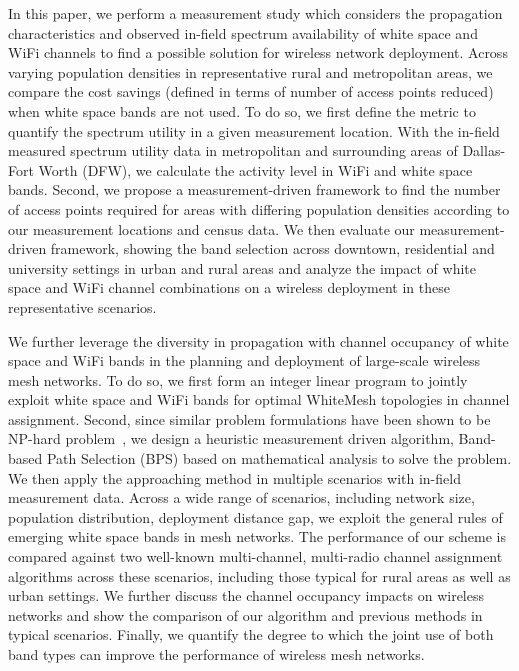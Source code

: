 In this paper, we perform a measurement study which considers the propagation 
characteristics and observed in-field spectrum availability of white space
and WiFi channels to find a possible solution for wireless network deployment. 
Across varying population densities in representative 
rural and metropolitan areas, we compare the cost savings (defined in terms of
number of access points reduced) when white space bands are not used.
To do so, we first define the metric to quantify the spectrum utility in a
given measurement location. With the in-field measured spectrum utility data 
in metropolitan and surrounding areas of Dallas-Fort Worth (DFW), we 
calculate the activity level in WiFi and white space bands. Second, we 
propose a measurement-driven framework to find the number of access points required 
for areas with differing population densities according to our measurement locations
and census data. We then evaluate our measurement-driven framework, showing
the band selection across downtown, residential and university settings in
urban and rural areas and analyze the impact of white space and WiFi
channel combinations on a wireless deployment in these representative scenarios.

We further leverage the diversity in propagation with channel occupancy of
white space and WiFi bands in the planning and deployment
of large-scale wireless mesh networks. 
To do so, we first form an
integer linear program to jointly exploit white space and WiFi 
bands for optimal WhiteMesh topologies in channel assignment. 
Second, since similar problem formulations have been shown to 
be NP-hard problem~\cite{jain2005impact,doraghinejad2014channel}, 
we design a heuristic measurement driven algorithm, Band-based 
Path Selection (BPS) based on mathematical analysis to solve the problem. 
We then apply the approaching method in multiple scenarios with in-field
measurement data. Across a wide range of scenarios, including 
network size, population distribution, deployment distance gap, we 
exploit the general rules of emerging white space bands in mesh networks. 
The performance of our scheme is compared against two well-known 
multi-channel, multi-radio channel assignment algorithms across 
these scenarios, including those typical for rural areas as well 
as urban settings. We further discuss the channel occupancy 
impacts on wireless networks and show the comparison of our
algorithm and previous methods in typical scenarios. 
Finally, we quantify the degree to which the joint use of 
both band types can improve the performance of wireless mesh networks.


